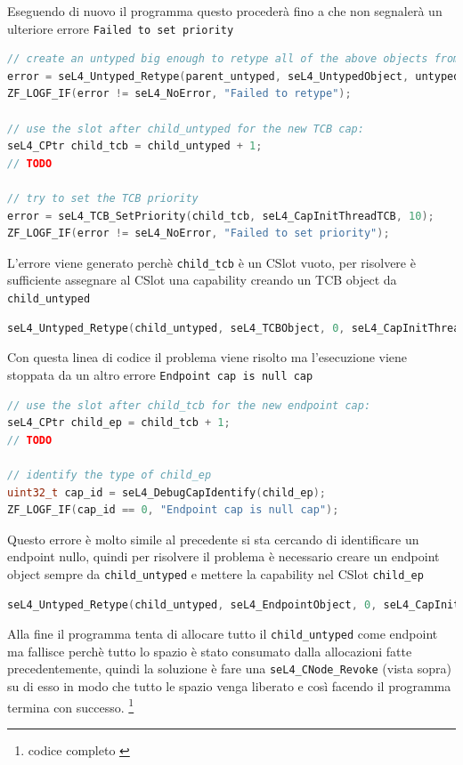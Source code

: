 Eseguendo di nuovo il programma questo procederà fino a che non segnalerà un ulteriore errore \texttt{Failed to set priority}
\begin{lstlisting}[language=C++]
// create an untyped big enough to retype all of the above objects from
error = seL4_Untyped_Retype(parent_untyped, seL4_UntypedObject, untyped_size_bits, seL4_CapInitThreadCNode, 0, 0, child_untyped, 1);
ZF_LOGF_IF(error != seL4_NoError, "Failed to retype");

// use the slot after child_untyped for the new TCB cap:
seL4_CPtr child_tcb = child_untyped + 1;
// TODO

// try to set the TCB priority
error = seL4_TCB_SetPriority(child_tcb, seL4_CapInitThreadTCB, 10);
ZF_LOGF_IF(error != seL4_NoError, "Failed to set priority");
\end{lstlisting}
L'errore viene generato perchè \texttt{child\_tcb} è un CSlot vuoto, per risolvere è sufficiente assegnare al CSlot una capability creando un TCB object da \texttt{child\_untyped}
\begin{lstlisting}[language=C++]
seL4_Untyped_Retype(child_untyped, seL4_TCBObject, 0, seL4_CapInitThreadCNode, 0, 0, child_tcb, 1);
\end{lstlisting}
Con questa linea di codice il problema viene risolto ma l'esecuzione viene stoppata da un altro errore \texttt{Endpoint cap is null cap}
\begin{lstlisting}[language=C++]
// use the slot after child_tcb for the new endpoint cap:
seL4_CPtr child_ep = child_tcb + 1;
// TODO

// identify the type of child_ep
uint32_t cap_id = seL4_DebugCapIdentify(child_ep);
ZF_LOGF_IF(cap_id == 0, "Endpoint cap is null cap");
\end{lstlisting}
Questo errore è molto simile al precedente si sta cercando di identificare un endpoint nullo, quindi per risolvere il problema è necessario creare un endpoint object sempre da \texttt{child\_untyped} e mettere la capability nel CSlot \texttt{child\_ep}
\begin{lstlisting}[language=C++]
seL4_Untyped_Retype(child_untyped, seL4_EndpointObject, 0, seL4_CapInitThreadCNode, 0, 0, child_ep, 1);
\end{lstlisting}
Alla fine il programma tenta di allocare tutto il \texttt{child\_untyped} come endpoint ma fallisce perchè tutto lo spazio è stato consumato dalla allocazioni fatte precedentemente, quindi la soluzione è fare una \texttt{seL4\_CNode\_Revoke} (vista sopra) su di esso in modo che tutto le spazio venga liberato e così facendo il programma termina con successo. \footnote{codice completo \cite{untyped}}

